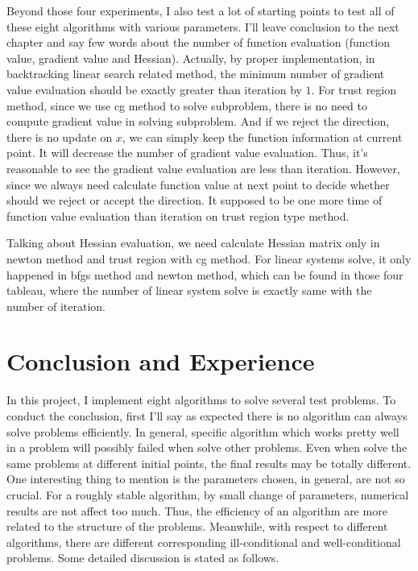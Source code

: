 \documentclass[11pt]{report}
\begin{document}
Beyond those four experiments, I also test a lot of starting points to test all of these eight algorithms with various parameters. I'll leave conclusion to the next chapter and say few words about the number of function evaluation (function value, gradient value and Hessian). Actually, by proper implementation, in backtracking linear search related method, the minimum number of gradient value evaluation should be exactly greater than iteration by $1$. For trust region method, since we use cg method to solve subproblem, there is no need to compute gradient value in solving subproblem. And if we reject the direction, there is no update on $x$, we can simply keep the function information at current point. It will decrease the number of gradient value evaluation. Thus, it's reasonable to see the gradient value evaluation are less than iteration. However, since we always need calculate function value at next point to decide whether should we reject or accept the direction. It supposed to be one more time of function value evaluation than iteration on trust region type method. 

Talking about Hessian evaluation, we need calculate Hessian matrix only in newton method and trust region with cg method. For linear systems solve, it only happened in bfgs method and newton method, which can be found in those four tableau, where the number of linear system solve is exactly same with the number of iteration.

\chapter{Conclusion and Experience}

In this project, I implement eight algorithms to solve several test problems. To conduct the conclusion, first I'll say as expected there is no algorithm can always solve problems efficiently. In general, specific algorithm which works pretty well in a problem will possibly failed when solve other problems. Even when solve the same problems at different initial points, the final results may be totally different. One interesting thing to mention is the parameters chosen, in general, are not so crucial. For a roughly stable algorithm, by small change of parameters, numerical results are not affect too much. Thus, the efficiency of an algorithm are more related to the structure of the problems. Meanwhile, with respect to different algorithms, there are different corresponding ill-conditional and well-conditional problems. Some detailed discussion is stated as follows.
\end{document}
